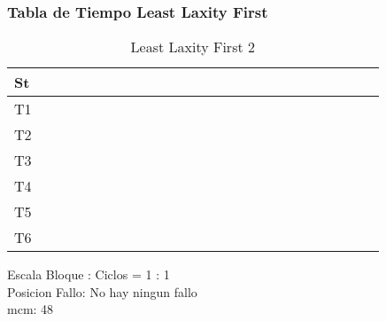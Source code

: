 \documentclass[xcolor=table]{beamer}
\begin{document}
\begin{frame} 
\frametitle{Tabla de Tiempo  Least Laxity First } 
\begin{table} 
\centering 
\begin{tabular}{|l|l|l|l|l|l|l|l|l|l|l|l|l|l|l|l|l|l|l|l|l|l|l|l|l|} 
\hline 
St & \cellcolor{green} & \cellcolor{green} & \cellcolor{green} & \cellcolor{green} & \cellcolor{green} & \cellcolor{green} & \cellcolor{green} & \cellcolor{green} & \cellcolor{green} & \cellcolor{green} & \cellcolor{green} & \cellcolor{green} & \cellcolor{green} & \cellcolor{green} & \cellcolor{green} & \cellcolor{green} & \cellcolor{green} & \cellcolor{green} & \cellcolor{green} & \cellcolor{green} & \cellcolor{green} & \cellcolor{green} & \cellcolor{green} & \cellcolor{green} \\ \hline 
T1 & & & & & & & & & & & & & & & & & & & & & & & & \\ \hline 
T2 & & & & & & & & & & & & & & & & & & & & & & & & \\ \hline 
T3 & & & & & & & & & & & & & & & & & & & & & & & & \\ \hline 
T4 & & & & & & & & & & & & & & & & & & & & & & & & \\ \hline 
T5 & & & & & & & & & & & & & & & & & & & & & & & & \\ \hline 
T6 & & & & & & & & & & & & & & & & & & & & & & & & \\ \hline 
\end{tabular} 
\caption{ Least Laxity First 2 } 
\end{table} 
Escala Bloque : Ciclos = 1 : 1 \\ 
Posicion Fallo: No hay ningun fallo \\ 
mcm:  48 \\ 
\end{frame} 

\end{document}
